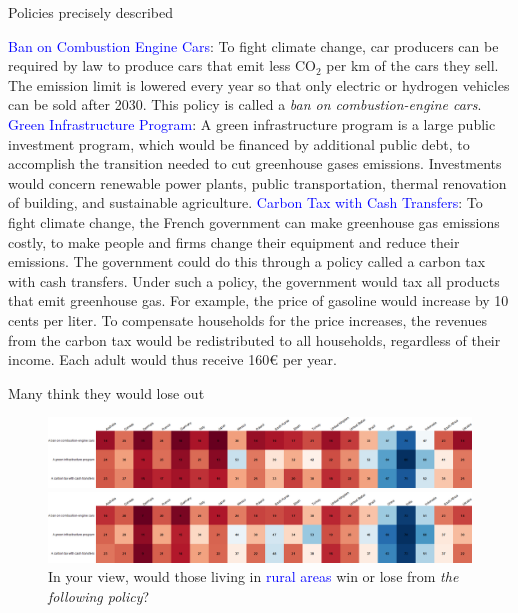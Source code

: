 \begin{frame}{Policies precisely described}%
	\begin{itemize}
	\ip \textcolor{blue}{Ban on Combustion Engine Cars}: To fight climate change, car producers can be required by law to produce cars that emit less CO$_\text{2}$ per km of the cars they sell. The emission limit is lowered every year so that only electric or hydrogen vehicles can be sold after 2030. This policy is called a \textit{ban on combustion-engine cars}.
	\ip \textcolor{blue}{Green Infrastructure Program}: A green infrastructure program is a large public investment program, which would be financed by additional public debt, to accomplish the transition needed to cut greenhouse gases emissions. Investments would concern renewable power plants, public transportation, thermal renovation of building, and sustainable agriculture.
	\ip \textcolor{blue}{Carbon Tax with Cash Transfers}: To fight climate change, the French government can make greenhouse gas emissions costly, to make people and firms change their equipment and reduce their emissions. The government could do this through a policy called a carbon tax with cash transfers. Under such a policy, the government would tax all products that emit greenhouse gas. For example, the price of gasoline would increase by 10 cents per liter. To compensate households for the price increases, the revenues from the carbon tax would be redistributed to all households, regardless of their income. Each adult would thus receive 160\euro{} per year.
	\end{itemize}
\end{frame}
	

\begin{frame}{Many think they would lose out}%
	\begin{figure}[h!]
	\centering
	\caption{%
	Do you think that \textcolor{blue}{financially your household} would win or lose from \textit{the policy}?}
	\includegraphics[width=\textwidth]{../figures/country_comparison/policies_win_lose_self_positive_countries.png}
	\vspace{-.1cm}
	\centering
	\caption{%
	In your view, would those living in \textcolor{blue}{rural areas} win or lose from \textit{the following policy}?}
	\includegraphics[width=\textwidth]{../figures/country_comparison/policies_win_lose_rural_positive_countries.png}
	\end{figure}
\end{frame}
	
